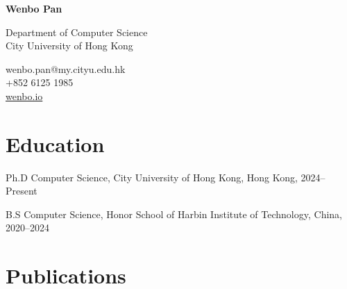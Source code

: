 \documentclass[11pt,letterpaper]{report}
\newcommand{\myname}{Wenbo Pan}
\newcommand{\namefont}[1]{{\normalfont\bfseries\Huge{#1}}}
\begin{document}
\raggedright{}

\namefont{\myname}

\vspace{1em}
\begin{minipage}[t]{0.700\textwidth}
Department of Computer Science \\
City University of Hong Kong
\end{minipage}
\begin{minipage}[t]{0.295\textwidth}
\flushright{}
wenbo.pan@my.cityu.edu.hk \\
+852 6125 1985 \\
\href{https://wenbo.io}{wenbo.io}
\end{minipage}


\section*{Education}

\begin{tablist}

\item[Ph.D] \tab{}Computer Science, City University of Hong Kong, Hong Kong, 2024--Present \\

\item[B.S] \tab{}Computer Science, Honor School of Harbin Institute of Technology, China, 2020--2024 \\

\end{tablist}

\section*{Publications}
\end{document}
